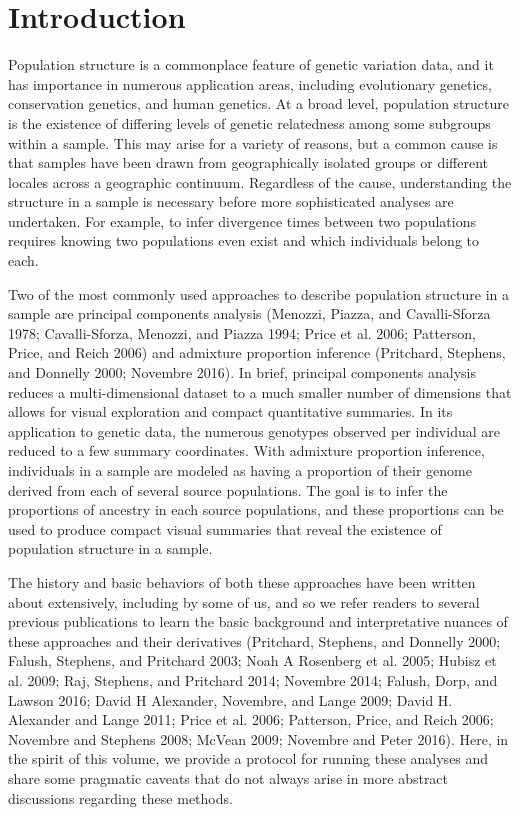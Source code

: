 \documentclass[smallextended]{svjour3}       %
\begin{document}
\def\spacingset#1{\renewcommand{\baselinestretch}%
{#1}\small\normalsize} \spacingset{1}


\section{Introduction}\label{introduction}

Population structure is a commonplace feature of genetic variation data,
and it has importance in numerous application areas, including
evolutionary genetics, conservation genetics, and human genetics. At a
broad level, population structure is the existence of differing levels
of genetic relatedness among some subgroups within a sample. This may
arise for a variety of reasons, but a common cause is that samples have
been drawn from geographically isolated groups or different locales
across a geographic continuum. Regardless of the cause, understanding
the structure in a sample is necessary before more sophisticated
analyses are undertaken. For example, to infer divergence times between
two populations requires knowing two populations even exist and which
individuals belong to each.

Two of the most commonly used approaches to describe population
structure in a sample are principal components analysis (Menozzi,
Piazza, and Cavalli-Sforza 1978; Cavalli-Sforza, Menozzi, and Piazza
1994; Price et al. 2006; Patterson, Price, and Reich 2006) and admixture
proportion inference (Pritchard, Stephens, and Donnelly 2000; Novembre
2016). In brief, principal components analysis reduces a
multi-dimensional dataset to a much smaller number of dimensions that
allows for visual exploration and compact quantitative summaries. In its
application to genetic data, the numerous genotypes observed per
individual are reduced to a few summary coordinates. With admixture
proportion inference, individuals in a sample are modeled as having a
proportion of their genome derived from each of several source
populations. The goal is to infer the proportions of ancestry in each
source populations, and these proportions can be used to produce compact
visual summaries that reveal the existence of population structure in a
sample.

The history and basic behaviors of both these approaches have been
written about extensively, including by some of us, and so we refer
readers to several previous publications to learn the basic background
and interpretative nuances of these approaches and their derivatives
(Pritchard, Stephens, and Donnelly 2000; Falush, Stephens, and Pritchard
2003; Noah A Rosenberg et al. 2005; Hubisz et al. 2009; Raj, Stephens,
and Pritchard 2014; Novembre 2014; Falush, Dorp, and Lawson 2016; David
H Alexander, Novembre, and Lange 2009; David H. Alexander and Lange
2011; Price et al. 2006; Patterson, Price, and Reich 2006; Novembre and
Stephens 2008; McVean 2009; Novembre and Peter 2016). Here, in the
spirit of this volume, we provide a protocol for running these analyses
and share some pragmatic caveats that do not always arise in more
abstract discussions regarding these methods.
\end{document}
